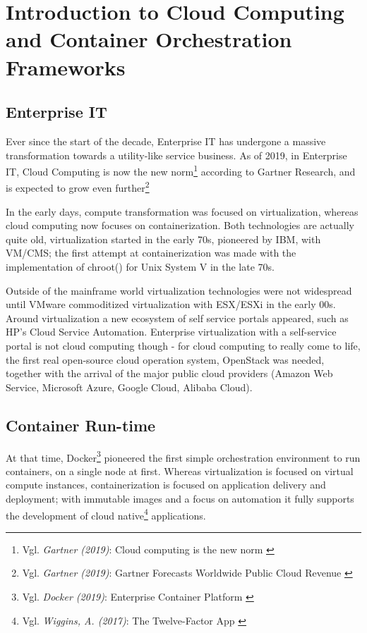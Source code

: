 %
%

\pagebreak
\section{Introduction to Cloud Computing and Container Orchestration Frameworks}

\onehalfspacing

\subsection{Enterprise IT}

Ever since the start of the decade, Enterprise IT has undergone a massive transformation towards a utility-like service business. As of 2019, in Enterprise IT, Cloud Computing is now the new norm\footnote{Vgl. \textit{Gartner (2019)}: Cloud computing is the new norm \cite{gartnerCloudStatement}} according to Gartner Research, and is expected to grow even further\footnote{Vgl. \textit{Gartner (2019)}: Gartner Forecasts Worldwide Public Cloud Revenue \cite{gartnerForecast}}

In the early days, compute transformation was focused on virtualization, whereas cloud computing now focuses on containerization. Both technologies are actually quite old, virtualization started in the early 70s, pioneered by IBM, with VM/CMS; the first attempt at containerization was made with the implementation of chroot() for Unix System V in the late 70s.

Outside of the mainframe world virtualization technologies were not widespread until VMware commoditized virtualization with ESX/ESXi in the early 00s. Around virtualization a new ecosystem of self service portals appeared, such as HP's Cloud Service Automation. Enterprise virtualization with a self-service portal is not cloud computing though - for cloud computing to really come to life, the first real open-source cloud operation system, OpenStack was needed, together with the arrival of the major public cloud providers (Amazon Web Service, Microsoft Azure, Google Cloud, Alibaba Cloud).

\subsection{Container Run-time}

At that time, Docker\footnote{Vgl. \textit{Docker (2019)}: Enterprise Container Platform \cite{docker}} pioneered the first simple orchestration environment to run containers, on a single node at first. Whereas virtualization is focused on virtual compute instances, containerization is focused on application delivery and deployment; with immutable images and a focus on automation it fully supports the development of cloud native\footnote{Vgl. \textit{Wiggins, A. (2017)}: The Twelve-Factor App \cite{12factor}} applications.

